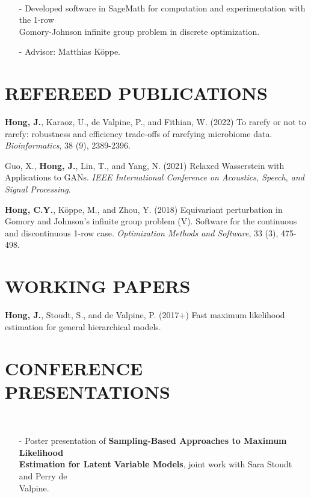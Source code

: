 \documentclass{res}
\begin{document}
\begin{resume}
     \\ 
        \begin{itemize}
        \item[-] Developed software in SageMath for computation and experimentation
       with the 1-row \\ Gomory-Johnson infinite group problem in discrete optimization.
       \item[-] Advisor: Matthias K\"{o}ppe.
        \end{itemize}

\section{REFEREED PUBLICATIONS}
\textbf{Hong, J.}, Karaoz, U., de Valpine, P., and Fithian, W. (2022) To rarefy or not to rarefy: robustness and efficiency trade-offs of rarefying microbiome data. \textit{Bioinformatics}, 38 (9), 2389-2396.

Guo, X., \textbf{Hong, J.}, Lin, T., and Yang, N. (2021) Relaxed Wasserstein with Applications to GANs. \textit{IEEE International Conference on Acoustics, Speech, and Signal Processing}.

\textbf{Hong, C.Y.}, K\"{o}ppe, M., and Zhou, Y. (2018) Equivariant perturbation in Gomory and Johnson's infinite group problem (V). Software for the continuous and discontinuous 1-row case. \textit{Optimization Methods and Software}, 33 (3), 475-498.

\section{WORKING PAPERS}
\textbf{Hong, J.}, Stoudt, S., and de Valpine, P. (2017+) Fast maximum likelihood estimation for general hierarchical models.

\section{CONFERENCE PRESENTATIONS}
  \\ 
    \begin{itemize}\setlength\itemsep{0em}
    \item[-] Poster presentation of \textbf{Sampling-Based Approaches to Maximum Likelihood \\Estimation for Latent Variable Models}, joint work with Sara Stoudt and Perry de \\Valpine.
    \end{itemize}


\end{resume}
\end{document}
